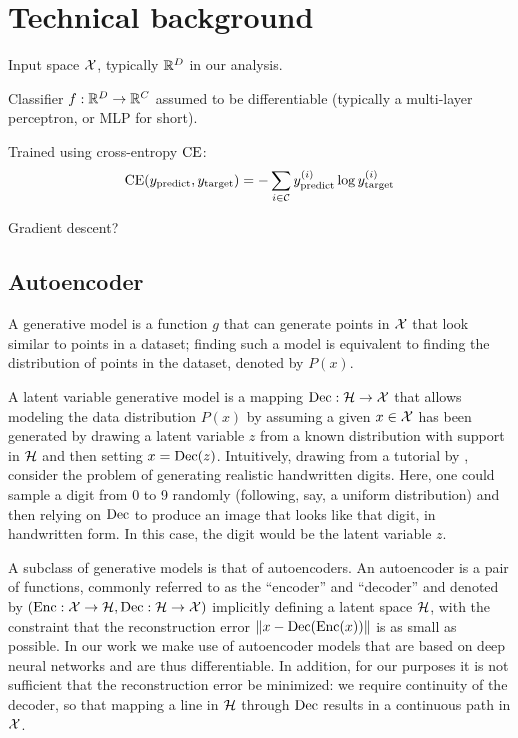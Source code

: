 \documentclass[../main.tex]{subfiles}
\begin{document}
\chapter{Technical background}
\label{ch:background}

Input space $\mathcal{X}$, typically $\mathbb{R}^D$ in our analysis.

Classifier $f: \mathbb{R}^D \to \mathbb{R}^C$ assumed to be differentiable (typically a multi-layer perceptron, or MLP for short).

Trained using cross-entropy $\text{CE}$:
\begin{equation}
    \text{CE}(y_\text{predict}, y_{\mathrm{target}}) = - \sum_{i \in \mathcal{C}} y_\text{predict}^{(i)} \log y_{\mathrm{target}}^{(i)}
\end{equation}

Gradient descent?


\section{Autoencoder}

A generative model is a function $g$ that can generate points in $\mathcal{X}$ that look similar to points in a dataset; finding such a model is equivalent to finding the distribution of points in the dataset, denoted by $P(x)$.

A latent variable generative model is a mapping $\operatorname{Dec}: \mathcal{H} \to \mathcal{X}$ that allows modeling the data distribution $P(x)$ by assuming a given $x \in \mathcal{X}$ has been generated by drawing a latent variable $z$ from a known distribution with support in $\mathcal{H}$ and then setting $x = \operatorname{Dec}(z)$.
Intuitively, drawing from a tutorial by \citeauthor{doerschTutorial2021}, consider the problem of generating realistic handwritten digits.
Here, one could sample a digit from 0 to 9 randomly (following, say, a uniform distribution) and then relying on $\operatorname{Dec}$ to produce an image that looks like that digit, in handwritten form. In this case, the digit would be the latent variable $z$.

A subclass of generative models is that of autoencoders.
An autoencoder is a pair of functions, commonly referred to as the ``encoder'' and ``decoder'' and denoted by $(\operatorname{Enc}: \mathcal{X} \to \mathcal{H}, \operatorname{Dec}: \mathcal{H} \to \mathcal{X})$ implicitly defining a latent space $\mathcal{H}$, with the constraint that the reconstruction error $\left\lVert x - \operatorname{Dec}(\operatorname{Enc}(x))\right\rVert$ is as small as possible.
In our work we make use of autoencoder models that are based on deep neural networks and are thus differentiable.
In addition, for our purposes it is not sufficient that the reconstruction error be minimized: we require continuity of the decoder, so that mapping a line in $\mathcal{H}$ through $\operatorname{Dec}$ results in a continuous path in $\mathcal{X}$.
\end{document}
